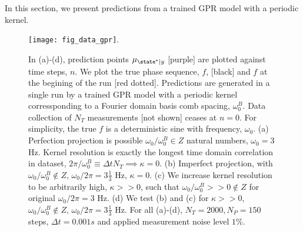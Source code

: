 

In this section, we present predictions from a trained GPR model with a periodic kernel. %
\begin{figure}
    \texttt{[image: fig\_data\_gpr]}. 
    \caption{\label{fig:main:fig_data_gpr} In (a)-(d), prediction points $\mu_{\state^*|y}$ [purple] are plotted against time steps, $n$. We plot the true phase sequence,  $f$, [black] and  $f$ at the begining of the run [red dotted]. Predictions are generated in a single run by a trained GPR model with a periodic kernel corressponding to a Fourier domain basis comb spacing, $\omega_0^B$. Data collection of $N_T$ measurements [not shown] ceases at $n=0$. For simplicity, the true $f$ is a deterministic sine with frequency, $\omega_0$. (a) Perfection projection is possible $\omega_0 / \omega_0^B \in Z$ natural numbers, $\omega_0 = 3$ Hz. Kernel resolution is exactly the longest time domain correlation in dataset, $2 \pi / \omega_0^B \equiv \Delta t N_T \implies \kappa = 0$.   (b) Imperfect projection, with $\omega_0 / \omega_0^B \notin Z$, $\omega_0 / 2 \pi = 3 \frac{1}{3}$ Hz, $\kappa=0$. (c) We increase kernel resolution to be arbitrarily high, $\kappa >> 0 $, such that $\omega_0 / \omega_0^B >> 0 \notin Z $ for original $ \omega_0 / 2 \pi = 3$ Hz. (d) We test (b) and (c) for $\kappa >>0$, $ \omega_0 / \omega_0^B \notin Z$, $\omega_0 / 2 \pi = 3 \frac{1}{3}$ Hz. For all (a)-(d), $N_T = 2000, N_P = 150$ steps, $\Delta t = 0.001s$ and applied measurement noise level $1\%$.} 
\end{figure}
